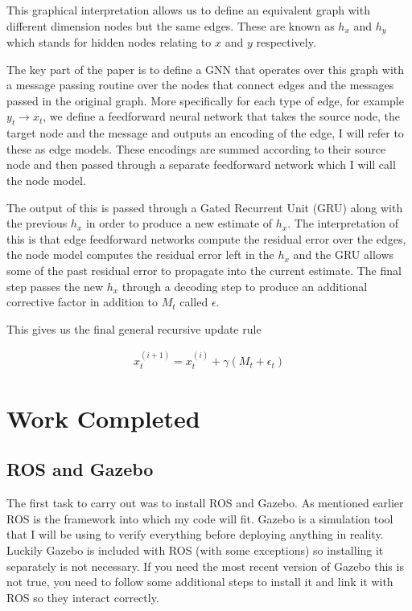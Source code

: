 \documentclass[]{../resources/final_report}
\begin{document}
This graphical interpretation allows us to define an equivalent graph with different dimension nodes 
but the same edges. These are known as $h_x$ and $h_y$ which stands for hidden nodes relating to $x$ 
and $y$ respectively. 


The key part of the paper is to define a GNN that operates over this graph with a message passing
routine over the nodes that connect edges and the messages passed in the original 
graph. More specifically for each type of edge, for example $y_t \rightarrow x_t$, we define a 
feedforward neural network that takes the source node, the target node and the message and outputs 
an encoding of the edge, I will refer to these as edge models. These encodings are summed according 
to their source node and then passed through a separate feedforward network which I will call the 
node model. 

The output of this is passed through a Gated Recurrent Unit (GRU) along with the 
previous $h_x$ in order to produce a new estimate of $h_x$. The interpretation of this is that 
edge feedforward networks compute the residual error over the edges, the node model computes the 
residual error left in the $h_x$ and the GRU allows some of the past residual error to propagate 
into the current estimate. The final step passes the new $h_x$ through a decoding step to produce an additional corrective 
factor in addition to $M_t$ called $\epsilon$.

This gives us the final general recursive update rule

\begin{align}
  x_t^{(i+1)} = x_t^{(i)} + \gamma (M_t + \epsilon_t)
\end{align}


\chapter{Work Completed}

\section{ROS and Gazebo}

The first task to carry out was to install ROS and Gazebo. As mentioned earlier ROS is the framework 
into which my code will fit. Gazebo is a simulation tool that I will be using to verify everything 
before deploying anything in reality. Luckily Gazebo is included with ROS (with some exceptions) so 
installing it separately is not necessary. If you need the most recent version of Gazebo this is not 
true, you need to follow some additional steps to install it and link it with ROS so they interact 
correctly.
\end{document}
